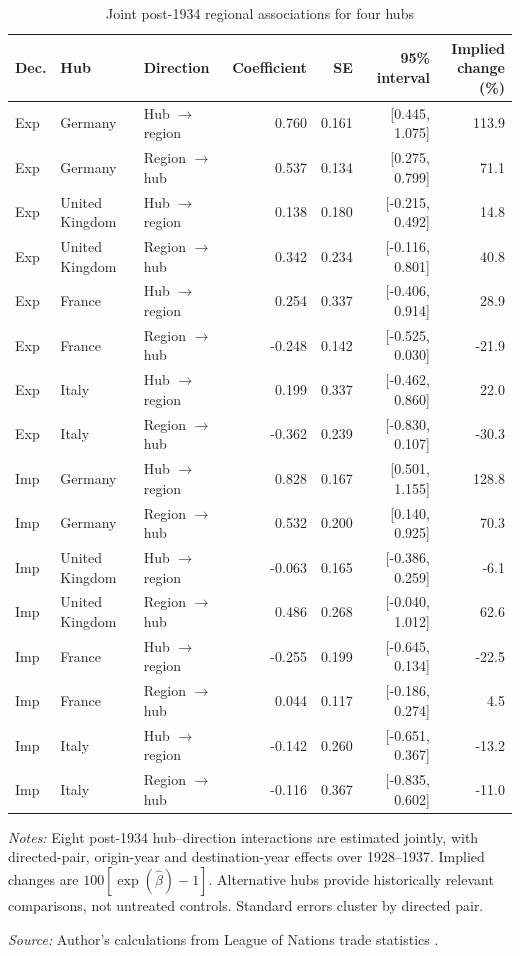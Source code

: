 \begin{table}[!htbp]\centering
\caption{Joint post-1934 regional associations for four hubs}\label{tab:app_hubs}
\begin{threeparttable}\footnotesize\setlength{\tabcolsep}{4pt}
\begin{tabular}{@{}lllr rrr@{}}
\toprule
Dec. & Hub & Direction & Coefficient & SE & 95\% interval & \shortstack{Implied\\change (\%)} \\
\midrule
Exp & Germany & Hub $\to$ region & 0.760 & 0.161 & [0.445, 1.075] & 113.9 \\
Exp & Germany & Region $\to$ hub & 0.537 & 0.134 & [0.275, 0.799] & 71.1 \\
Exp & United Kingdom & Hub $\to$ region & 0.138 & 0.180 & [-0.215, 0.492] & 14.8 \\
Exp & United Kingdom & Region $\to$ hub & 0.342 & 0.234 & [-0.116, 0.801] & 40.8 \\
Exp & France & Hub $\to$ region & 0.254 & 0.337 & [-0.406, 0.914] & 28.9 \\
Exp & France & Region $\to$ hub & -0.248 & 0.142 & [-0.525, 0.030] & -21.9 \\
Exp & Italy & Hub $\to$ region & 0.199 & 0.337 & [-0.462, 0.860] & 22.0 \\
Exp & Italy & Region $\to$ hub & -0.362 & 0.239 & [-0.830, 0.107] & -30.3 \\
Imp & Germany & Hub $\to$ region & 0.828 & 0.167 & [0.501, 1.155] & 128.8 \\
Imp & Germany & Region $\to$ hub & 0.532 & 0.200 & [0.140, 0.925] & 70.3 \\
Imp & United Kingdom & Hub $\to$ region & -0.063 & 0.165 & [-0.386, 0.259] & -6.1 \\
Imp & United Kingdom & Region $\to$ hub & 0.486 & 0.268 & [-0.040, 1.012] & 62.6 \\
Imp & France & Hub $\to$ region & -0.255 & 0.199 & [-0.645, 0.134] & -22.5 \\
Imp & France & Region $\to$ hub & 0.044 & 0.117 & [-0.186, 0.274] & 4.5 \\
Imp & Italy & Hub $\to$ region & -0.142 & 0.260 & [-0.651, 0.367] & -13.2 \\
Imp & Italy & Region $\to$ hub & -0.116 & 0.367 & [-0.835, 0.602] & -11.0 \\
\bottomrule
\end{tabular}
\begin{tablenotes}[flushleft]\footnotesize\item \textit{Notes:} Eight post-1934 hub--direction interactions are estimated jointly, with directed-pair, origin-year and destination-year effects over 1928--1937. Implied changes are $100[\exp(\widehat\beta)-1]$. Alternative hubs provide historically relevant comparisons, not untreated controls. Standard errors cluster by directed pair.
\item \textit{Source:} Author's calculations from League of Nations trade statistics \parencite{league1930,league1936,league1938}.
\end{tablenotes}\end{threeparttable}\end{table}
